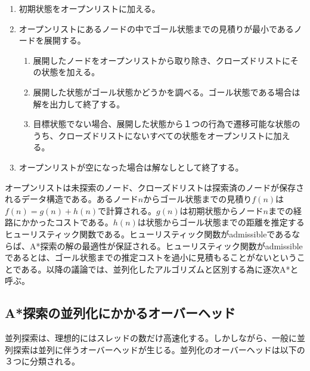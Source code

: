\documentclass{jsarticle}
\renewcommand{\textbf}{} %
\begin{document}
\begin{enumerate}
	\item 初期状態をオープンリストに加える。
	\item オープンリストにあるノードの中でゴール状態までの見積りが最小であるノードを展開する。
	\begin{enumerate}
		\item 展開したノードをオープンリストから取り除き、クローズドリストにその状態を加える。
		\item 展開した状態がゴール状態かどうかを調べる。ゴール状態である場合は解を出力して終了する。
		\item 目標状態でない場合、展開した状態から１つの行為で遷移可能な状態のうち、クローズドリストにないすべての状態をオープンリストに加える。
	\end{enumerate}
	\item オープンリストが空になった場合は解なしとして終了する。
\end{enumerate}

オープンリストは未探索のノード、クローズドリストは探索済のノードが保存されるデータ構造である。あるノード$n$からゴール状態までの見積り$f(n)$は$f(n) = g(n) + h(n)$で計算される。$g(n)$は初期状態からノード$n$までの経路にかかったコストである。$h(n)$は状態からゴール状態までの距離を推定する\textbf{ヒューリスティック関数}である。ヒューリスティック関数が\textbf{admissible}であるならば、A*探索の解の最適性が保証される。ヒューリスティック関数がadmissibleであるとは、ゴール状態までの推定コストを過小に見積もることがないということである。以降の議論では、並列化したアルゴリズムと区別する為に\textbf{逐次A*}と呼ぶ。


\subsection{A*探索の並列化にかかるオーバーヘッド}

並列探索は、理想的にはスレッドの数だけ高速化する。しかしながら、一般に並列探索は並列に伴うオーバーヘッドが生じる。並列化のオーバーヘッドは以下の３つに分類される。
\end{document}
